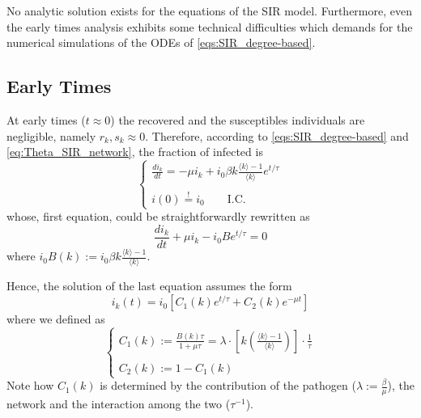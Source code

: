 \documentclass[a4paper,10pt,twoside]{book} %
\theoremstyle{definition}
\begin{document}
No analytic solution exists for the equations of the SIR model. Furthermore, even the early times analysis exhibits some technical difficulties which demands for the numerical simulations of the ODEs of \autoref{eqs:SIR_degree-based}.

\subsection*{Early Times}
At early times ($t\approx 0$) the recovered and the susceptibles individuals are negligible, namely $r_k, s_k\approx0$. Therefore, according to \autoref{eqs:SIR_degree-based} and \autoref{eq:Theta_SIR_network}, the fraction of infected is \vspace{3mm}
\begin{equation}
	\begin{cases}
		\frac{di_k}{dt} = - \mu i_k + i_0 \beta k \frac{\langle k \rangle -1}{\langle k \rangle } e^{t/\tau} \\ \\
		i(0) \stackrel{!}{=} i_0 \qquad \text{I.C.}
	\end{cases}
\end{equation}
whose, first equation, could be straightforwardly rewritten as
\begin{equation}
	\frac{d i_k}{dt} + \mu i_k - i_0 B e^{t/\tau} = 0
\end{equation}
where $i_0 B(k) := i_0 \beta k \frac{\langle k \rangle -1}{\langle k \rangle }$.

Hence, the solution of the last equation assumes the form
\begin{equation}
	i_k(t)=i_0 \left[C_1(k)e^{t/\tau} + C_2(k) e^{-\mu t}\right]
\end{equation}
where we defined as \vspace{3mm}
\begin{equation*}
	\begin{cases}
		C_1(k):= \frac{B(k) \tau}{1+ \mu \tau} = \lambda \cdot \left[k\left(\frac{\langle k \rangle -1}{\langle k \rangle }\right)\right]
		\cdot \frac{1}{\tau} \\ \\
		C_2(k):= 1 - C_1(k)
	\end{cases}
\end{equation*}
Note how $C_1(k)$ is determined by the contribution of the pathogen ($\lambda:=\frac{\beta}{\mu}$), the network and the interaction among the two ($\tau^{-1}$).
\end{document}
